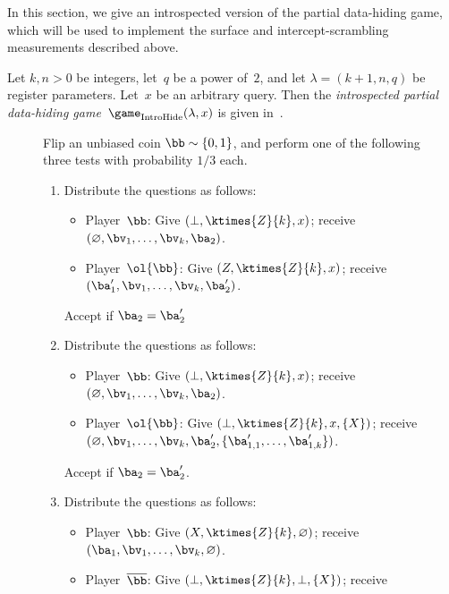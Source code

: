 In this section, we give an introspected version of the partial
data-hiding game, which will be used to implement the surface and
intercept-scrambling measurements described above.

\begin{definition}
Let $k, n >0$ be integers, let~$q$ be a power of~$2$,
and let $\lambda = (k+1, n, q)$ be register parameters.
Let~$x$ be an arbitrary query.
Then the \emph{introspected partial data-hiding game}~$\game_{\mathrm{IntroHide}}(\lambda, x)$ is given in~.
\end{definition}


{
\begin{figure}[htbp]
  Flip an unbiased coin $\bb \sim \{0, 1\}$, and perform one of the following three tests with
  probability $1/3$ each.
  \begin{enumerate}
    \item Distribute the questions as follows:\label{item:did-you-give-me-the-right-surface-or-not}
      \begin{itemize}
      \item[$\circ$] Player~$\bb$: Give $(\bot, \ktimes{Z}{k}, x)$; receive
        $(\varnothing, \bv_1, \dots, \bv_k, \ba_2)$.
      \item[$\circ$] Player~$\ol{\bb}$: Give $(Z, \ktimes{Z}{k}, x)$; receive
        $(\ba'_1, \bv_1, \dots, \bv_k, \ba'_2)$.
      \end{itemize}
      Accept if $\ba_2 = \ba'_2$
    \item Distribute the questions as follows:
      \begin{itemize}
        \item[$\circ$] Player~$\bb$: Give $(\bot, \ktimes{Z}{k}, x)$; receive
          $(\varnothing,\bv_1, \dots, \bv_k, \ba_2)$.
        \item[$\circ$] Player~$\ol{\bb}$: Give $(\bot, \ktimes{Z}{k}, x,
          \{X\})$; receive $(\varnothing, \bv_1, \dots, \bv_k, \ba'_2, \{\ba_{1,1}', \dots, \ba_{1,k}'\})$.
        \end{itemize}
        Accept if $\ba_2 = \ba_2'$.
      \item Distribute the questions as follows:
        \begin{itemize}
        \item[$\circ$] Player~$\bb$: Give $(X, \ktimes{Z}{k}, \varnothing)$;
          receive $(\ba_1, \bv_1, \dots, \bv_k, \varnothing)$.
        \item[$\circ$] Player~$\overline{\bb}$: Give $(\bot, \ktimes{Z}{k}, \bot, \{X\})$; receive

\end{itemize}
\end{enumerate}
\end{figure}}
